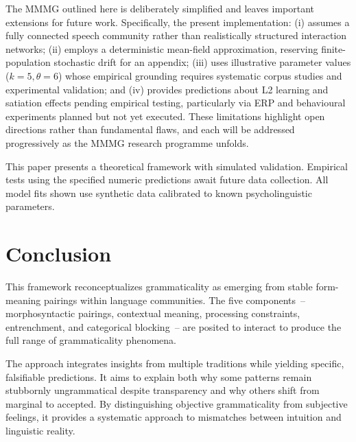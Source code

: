 \documentclass[12pt]{article}
\begin{document}

\begin{tcolorbox}[colback=lsLightBlue!30,title=Current limitations]
The MMMG outlined here is deliberately simplified and leaves important extensions for future work. Specifically, the present implementation:
(i) assumes a fully connected speech community rather than realistically structured interaction networks;  
(ii) employs a deterministic mean-field approximation, reserving finite-population stochastic drift for an appendix;  
(iii) uses illustrative parameter values (\(k=5,\theta=6\)) whose empirical grounding requires systematic corpus studies and experimental validation; and  
(iv) provides predictions about L2 learning and satiation effects pending empirical testing, particularly via ERP and behavioural experiments planned but not yet executed.
These limitations highlight open directions rather than fundamental flaws, and each will be addressed progressively as the MMMG research programme unfolds.
\end{tcolorbox}

\begin{tcolorbox}[colback=lsLightBlue!30,title=Scope and limitations]
This paper presents a theoretical framework with simulated validation. 
Empirical tests using the specified numeric predictions await future 
data collection. All model fits shown use synthetic data calibrated 
to known psycholinguistic parameters.
\end{tcolorbox}

\section{Conclusion}

This framework reconceptualizes grammaticality as emerging from stable form-meaning pairings within language communities. The five components~-- morphosyntactic pairings, contextual meaning, processing constraints, entrenchment, and categorical blocking~-- are posited to interact to produce the full range of grammaticality phenomena.

The approach integrates insights from multiple traditions while yielding specific, falsifiable predictions. It aims to explain both why some patterns remain stubbornly ungrammatical despite transparency and why others shift from marginal to accepted. By distinguishing objective grammaticality from subjective feelings, it provides a systematic approach to mismatches between intuition and linguistic reality.
\end{document}
